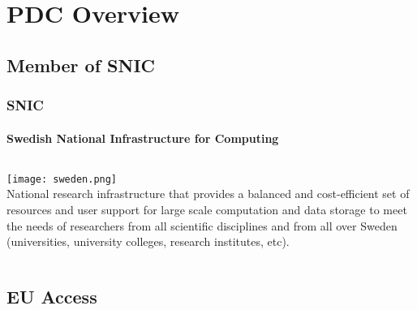 \section{PDC Overview}
\subsection*{Member of SNIC}

\frame
{
\frametitle{SNIC}
\framesubtitle{Swedish National Infrastructure for Computing}
\begin{columns}
\texttt{[image: sweden.png]}\\
National \alert{research infrastructure} that provides a \alert{balanced and cost-efficient} set of \alert{resources and user support} for \alert{large scale computation and data storage} to meet the needs of researchers from all scientific disciplines and from all over Sweden (universities, university colleges, research institutes, etc).
\end{columns}
}


\subsection*{EU Access}


